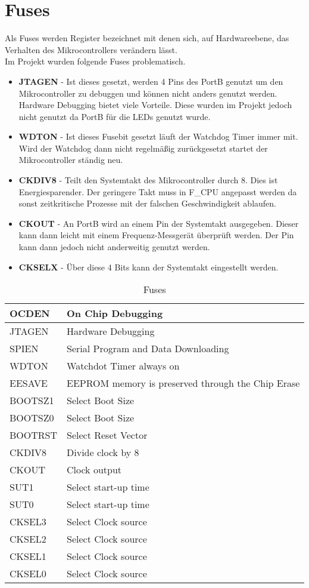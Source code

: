 \section{Fuses}
\label{sec:Fuses}
Als Fuses werden Register bezeichnet mit denen sich, auf Hardwareebene, das Verhalten des Mikrocontrollers verändern lässt. \\
Im Projekt wurden folgende Fuses problematisch.
\begin{itemize}
\item \textbf{JTAGEN} - Ist dieses  gesetzt, werden 4 Pins des PortB genutzt um den Mikrocontroller zu debuggen und können nicht anders genutzt werden. Hardware Debugging bietet viele Vorteile. Diese wurden im Projekt jedoch nicht genutzt da PortB für die LEDs genutzt wurde.
\item \textbf{WDTON} - Ist dieses Fusebit gesetzt läuft der Watchdog Timer immer mit. Wird der Watchdog dann nicht regelmäßig zurückgesetzt startet der Mikrocontroller ständig neu.
\item \textbf{CKDIV8} - Teilt den Systemtakt des Mikrocontroller durch 8. Dies ist Energiesparender. Der geringere Takt muss in F\_CPU angepasst werden da sonst zeitkritische Prozesse mit der falschen Geschwindigkeit ablaufen.
\item \textbf{CKOUT} - An PortB wird an einem Pin der Systemtakt ausgegeben. Dieser kann dann leicht mit einem Frequenz-Messgerät überprüft werden. Der Pin kann dann jedoch nicht anderweitig genutzt werden.
\item \textbf{CKSELX} - Über diese 4 Bits kann der Systemtakt eingestellt werden.
\end{itemize}
\begin{longtable}{|l|l|} 
\caption{Fuses} \\
\hline
\label{tab:Fuses}
OCDEN & On Chip Debugging \\ \hline 
JTAGEN & Hardware Debugging \\ \hline 
SPIEN & Serial Program and Data Downloading \\ \hline 
WDTON & Watchdot Timer always on \\ \hline 
EESAVE & EEPROM memory is preserved through the Chip Erase \\ \hline 
BOOTSZ1 & Select Boot Size \\ \hline 
BOOTSZ0 & Select Boot Size \\ \hline 
BOOTRST & Select Reset Vector \\ \hline 
CKDIV8 & Divide clock by 8 \\ \hline 
CKOUT & Clock output \\ \hline 
SUT1 & Select start-up time \\ \hline 
SUT0 & Select start-up time \\ \hline 
CKSEL3 & Select Clock source \\ \hline 
CKSEL2 & Select Clock source \\ \hline 
CKSEL1 & Select Clock source \\ \hline 
CKSEL0 & Select Clock source \\ \hline 
\end{longtable} 
